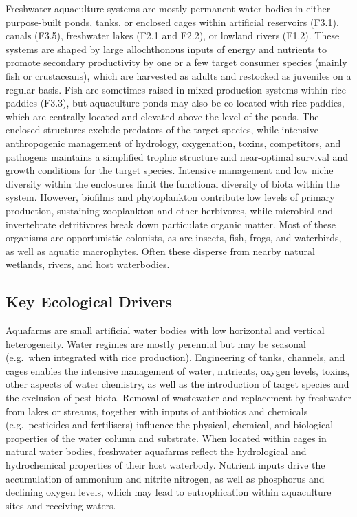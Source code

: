 \documentclass[
  letterpaper,
  DIV=11,
  numbers=noendperiod]{scrartcl}
\begin{document}
Freshwater aquaculture systems are mostly permanent water bodies in
either purpose-built ponds, tanks, or enclosed cages within artificial
reservoirs (F3.1), canals (F3.5), freshwater lakes (F2.1 and F2.2), or
lowland rivers (F1.2). These systems are shaped by large allochthonous
inputs of energy and nutrients to promote secondary productivity by one
or a few target consumer species (mainly fish or crustaceans), which are
harvested as adults and restocked as juveniles on a regular basis. Fish
are sometimes raised in mixed production systems within rice paddies
(F3.3), but aquaculture ponds may also be co-located with rice paddies,
which are centrally located and elevated above the level of the ponds.
The enclosed structures exclude predators of the target species, while
intensive anthropogenic management of hydrology, oxygenation, toxins,
competitors, and pathogens maintains a simplified trophic structure and
near-optimal survival and growth conditions for the target species.
Intensive management and low niche diversity within the enclosures limit
the functional diversity of biota within the system. However, biofilms
and phytoplankton contribute low levels of primary production,
sustaining zooplankton and other herbivores, while microbial and
invertebrate detritivores break down particulate organic matter. Most of
these organisms are opportunistic colonists, as are insects, fish,
frogs, and waterbirds, as well as aquatic macrophytes. Often these
disperse from nearby natural wetlands, rivers, and host waterbodies.

\subsection{Key Ecological Drivers}\label{key-ecological-drivers-20}

Aquafarms are small artificial water bodies with low horizontal and
vertical heterogeneity. Water regimes are mostly perennial but may be
seasonal (e.g.~when integrated with rice production). Engineering of
tanks, channels, and cages enables the intensive management of water,
nutrients, oxygen levels, toxins, other aspects of water chemistry, as
well as the introduction of target species and the exclusion of pest
biota. Removal of wastewater and replacement by freshwater from lakes or
streams, together with inputs of antibiotics and chemicals
(e.g.~pesticides and fertilisers) influence the physical, chemical, and
biological properties of the water column and substrate. When located
within cages in natural water bodies, freshwater aquafarms reflect the
hydrological and hydrochemical properties of their host waterbody.
Nutrient inputs drive the accumulation of ammonium and nitrite nitrogen,
as well as phosphorus and declining oxygen levels, which may lead to
eutrophication within aquaculture sites and receiving waters.
\end{document}

